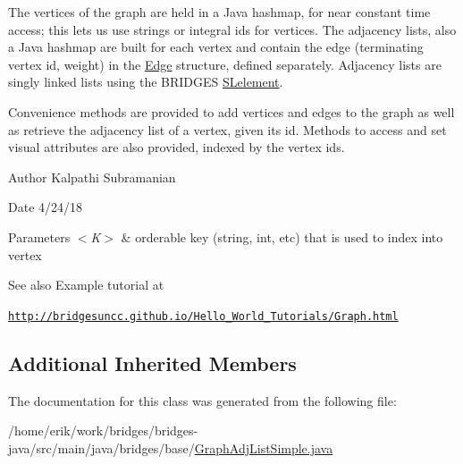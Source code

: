 The vertices of the graph are held in a Java hashmap, for near constant time access; this lets us use strings or integral ids for vertices. The adjacency lists, also a Java hashmap are built for each vertex and contain the edge (terminating vertex id, weight) in the \hyperlink{classbridges_1_1base_1_1_edge}{Edge} structure, defined separately. Adjacency lists are singly linked lists using the B\+R\+I\+D\+G\+ES \hyperlink{classbridges_1_1base_1_1_s_lelement}{S\+Lelement}.

Convenience methods are provided to add vertices and edges to the graph as well as retrieve the adjacency list of a vertex, given its id. Methods to access and set visual attributes are also provided, indexed by the vertex ids.

\begin{DoxyAuthor}{Author}
Kalpathi Subramanian
\end{DoxyAuthor}
\begin{DoxyDate}{Date}
4/24/18
\end{DoxyDate}

\begin{DoxyParams}{Parameters}
{\em $<$\+K$>$} & orderable key (string, int, etc) that is used to index into vertex\\
\hline
\end{DoxyParams}
\begin{DoxySeeAlso}{See also}
Example tutorial at 
\end{DoxySeeAlso}
\href{http://bridgesuncc.github.io/Hello_World_Tutorials/Graph.html}{\tt http\+://bridgesuncc.\+github.\+io/\+Hello\+\_\+\+World\+\_\+\+Tutorials/\+Graph.\+html} \subsection*{Additional Inherited Members}


The documentation for this class was generated from the following file\+:\begin{DoxyCompactItemize}
\item 
/home/erik/work/bridges/bridges-\/java/src/main/java/bridges/base/\hyperlink{_graph_adj_list_simple_8java}{Graph\+Adj\+List\+Simple.\+java}\end{DoxyCompactItemize}
